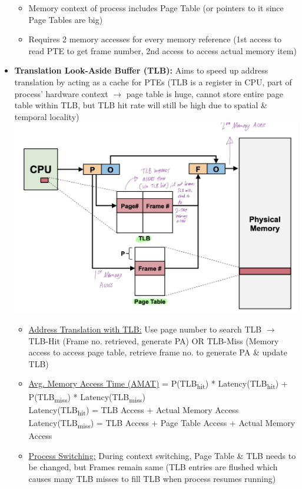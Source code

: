 \documentclass[landscape]{article}
\begin{document}
\begin{multicols*}{6}
\begin{itemize}
\begin{itemize}
        \item Memory context of process includes Page Table (or pointers to it since Page Tables are big)
        \item Requires 2 memory accesses for every memory reference (1st access to read PTE to get frame number, 2nd access to access actual memory item)
      \end{itemize}
      \item \textbf{Translation Look-Aside Buffer (TLB):} Aims to speed up address translation by acting as a cache for PTEs (TLB is a register in CPU, part of process' hardware context $\rightarrow$ page table is huge, cannot store entire page table within TLB, but TLB hit rate will still be high due to spatial \& temporal locality)
      \includegraphics[width=0.8\linewidth]{17_TLB.png}
      \begin{itemize}
        \item \underline{Address Translation with TLB:} Use page number to search TLB $\rightarrow$ TLB-Hit (Frame no. retrieved, generate PA) OR TLB-Miss (Memory access to access page table, retrieve frame no. to generate PA \& update TLB)
        \item \underline{Avg. Memory Access Time (AMAT)} = P(TLB\textsubscript{hit}) * Latency(TLB\textsubscript{hit}) + P(TLB\textsubscript{miss}) * Latency(TLB\textsubscript{miss}) \\ Latency(TLB\textsubscript{hit}) = TLB Access + Actual Memory Access \\ Latency(TLB\textsubscript{miss}) = TLB Access + Page Table Access + Actual Memory Access
        \item \underline{Process Switching:} During context switching, Page Table \& TLB needs to be changed, but Frames remain same (TLB entries are flushed which causes many TLB misses to fill TLB when process resumes running)

\end{itemize}
\end{itemize}
\end{multicols*}
\end{document}
